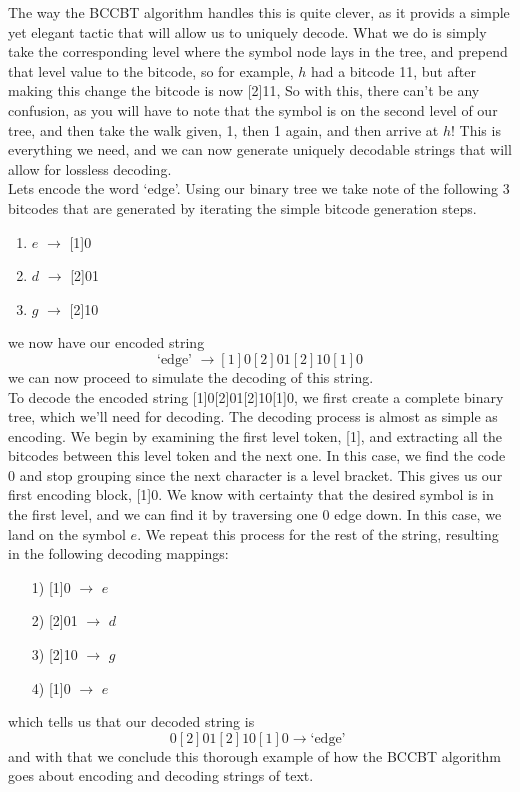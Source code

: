\documentclass[12pt]{IEEEtran}
\begin{document}
The way the BCCBT algorithm 
handles this is quite clever, as it provids a simple yet elegant tactic that will allow us to uniquely decode. What we do is simply take the corresponding level where the symbol node 
lays in the tree, and prepend that level value to the bitcode, so for example, $h$ had a bitcode 11, but after making this change the bitcode is now [2]11, So with this, there
can't be any confusion, as you will have to note that the symbol is on the second level of our tree, and then take the walk given, 1, then 1 again, and then arrive at $h$! This is everything we need,
and we can now generate uniquely decodable strings that will allow for lossless decoding.\\

Lets encode the word `edge'. Using our binary tree we take note of the following 3 bitcodes that are generated by iterating the 
simple bitcode generation steps.
\begin{enumerate}
	\item $e$ $\rightarrow$ [1]0
	\item $d$ $\rightarrow$ [2]01
	\item $g$ $\rightarrow$ [2]10
\end{enumerate}
we now have our encoded string
\begin{equation*}
	\text{`edge' } \rightarrow [1]0[2]01[2]10[1]0
\end{equation*}
we can now proceed to simulate the decoding of this string.\\

To decode the encoded string [1]0[2]01[2]10[1]0, we first create a complete binary tree, which we'll need for decoding. 
The decoding process is almost as simple as encoding. We begin by examining the first level token, [1], and extracting all the 
bitcodes between this level token and the next one. In this case, we find the code 0 and stop grouping since the next character is a 
level bracket. This gives us our first encoding block, [1]0. We know with certainty that the desired symbol is in the first level, and we can 
find it by traversing one 0 edge down. In this case, we land on the symbol $e$. We repeat this process for the rest of the string, resulting in the 
following decoding mappings:
\begin{enumerate}
	\item[1)] [1]0 $\rightarrow$ $e$
	\item[2)] [2]01 $\rightarrow$ $d$
	\item[3)] [2]10 $\rightarrow$ $g$
	\item[4)] [1]0 $\rightarrow$ $e$
\end{enumerate}
which tells us that our decoded string is 
\begin{equation*}
	[1]0[2]01[2]10[1]0 \rightarrow \text{`edge' }
\end{equation*}
and with that we conclude this thorough example of how the BCCBT algorithm goes about encoding and decoding strings of text.\\
\end{document}
